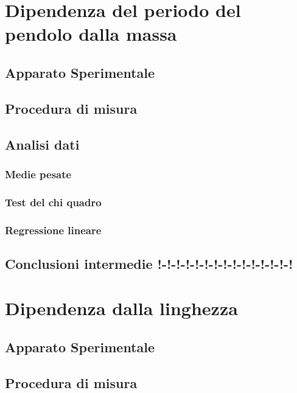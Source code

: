 \documentclass[11pt, twoside, a4paper]{article}
\begin{document}

\newpage

\newpage


\section{Dipendenza del periodo del pendolo dalla massa}
%
	\subsection{Apparato Sperimentale}
	
	\subsection{Procedura di misura}
	
	\subsection{Analisi dati}
		\subsubsection{Medie pesate}
		
		\subsubsection{Test del chi quadro}
		
		\subsubsection{Regressione lineare}
		
	\subsection{Conclusioni intermedie !-!-!-!-!-!-!-!-!-!-!-!-!-!-!}
	
\newpage
\section{Dipendenza dalla linghezza}
	
	\subsection{Apparato Sperimentale}
	
	\subsection{Procedura di misura}
	
\end{document}
